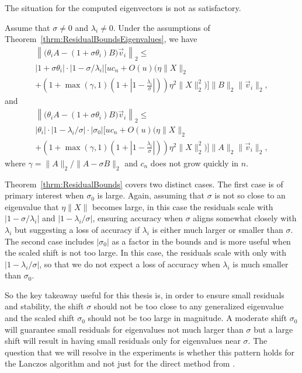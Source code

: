 The situation for the computed eigenvectors is not as satisfactory.
\begin{theorem}\label{thrm:ResidualBounds}
	Assume that $\sigma\neq 0$ and $\lambda_i\neq 0$.  Under the assumptions of Theorem~\ref{thrm:ResidualBoundsEigenvalues}, we have
	\begin{multline*}
		\left\| \big(\theta_i A - (1+\sigma \theta_i) B\big) \vec{v}_i \right\|_2
		\leq \\
		|1+\sigma \theta_i| \cdot |1-\sigma/\lambda_i| \Bigg[
		uc_n +O(u)\Bigg( \eta\|X\|_2 \\
		+ \left(1 + \max(\gamma, 1)
		\left(1+ \left| 1 - \frac{\lambda_i}{\sigma}\right|\right)\right)
		\eta^2\|X\|_2^2 \Bigg) \Bigg] \|B\|_2 \|\vec{v}_i\|_2,
	\end{multline*}
	and
	\begin{multline*}
		\left\| \big(\theta_i A - (1+\sigma \theta_i) B\big) \vec{v}_i \right\|_2
		\leq \\
		|\theta_i| \cdot |1-\lambda_i/\sigma| \cdot |\sigma_0| \Bigg[
		uc_n +O(u)\Bigg( \eta\|X\|_2 \\
		+ \left(1 + \max(\gamma, 1) \left(1+ \left| 1
		- \frac{\lambda_i}{\sigma}\right|\right)\right)
		\eta^2\|X\|_2^2 \Bigg) \Bigg] \|A\|_2 \|\vec{v}_i\|_2,
	\end{multline*}
        where $\gamma = \|A\|_2/ \|A-\sigma B\|_2$ and $c_n$ does not grow quickly in $n$.
\end{theorem}

Theorem~\ref{thrm:ResidualBounds} covers two distinct cases. The first case is of primary interest when $\sigma_0$ is large. Again, assuming that $\sigma$ is not so close to an eigenvalue that $\eta \|X\|$ becomes large, in this case the residuals scale with $\lvert 1 - \sigma/ \lambda_i \rvert$ and $\lvert 1 - \lambda_i/\sigma\rvert$, ensuring accuracy when $\sigma$ aligns somewhat closely with $\lambda_i$ but suggesting a loss of accuracy if $\lambda_i$ is either much larger or smaller than $\sigma$. The second case includes $|\sigma_0|$ as a factor in the bounds and is more useful when the scaled shift is not too large.  In this case, the residuals scale with only with $\lvert 1 - \lambda_i/\sigma\rvert$, so that we do not expect a loss of accuracy when $\lambda_i$ is much smaller than $\sigma_0$.

So the key takeaway useful for this thesis is, in order to ensure small residuals and stability, the shift $\sigma$ should not be too close to any generalized eigenvalue and the scaled shift $\sigma_0$ should not be too large in magnitude. A moderate shift $\sigma_0$ will guarantee small residuals for eigenvalues not much larger than $\sigma$ but a large shift will result in having small residuals only for eigenvalues near $\sigma$. The question that we will resolve in the experiments is whether this pattern holds for the Lanczos algorithm and not just for the direct method from \cite{stewart2024spectraltransformationdensesymmetric}. 


